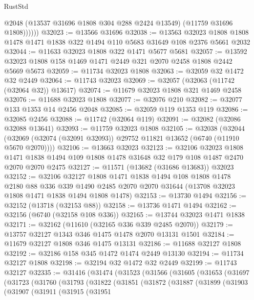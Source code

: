\begin{lexlean}{RustStd}
\begin{coremodule}
              @2048
              (@13537 @31696 @1808 @304 @288 @2424 @13549)
              (@11759 @31696 @1808))))))
@32023 := @13566 @31696
@32038 := @13563
    @32023
    @1808
    @1808
    @1478
    @1471
    @1838
    @322
    @1494
    @110
    @5683
    @31649
    @108
    @2376
    @5661
    @2032
@32044 := @11633 @32023 @1808 @322 @1471 @5677 @5681
@32057 := @13592 @32023 @1808 @158 @1469 @1471 @2449 @321 @2070 @2458 @1808 @2442 @5669 @5673
@32059 := @11734 @32023 @1808
@32063 := @32059 @32 @1472 @32 @2449
@32064 := @11743 @32023
@32069 := @32057 (@32063 (@11742 (@32064 @32)) @13617)
@32074 := @11679 @32023 @1808 @321 @1469 @2458
@32076 := @11688 @32023 @1808
@32077 := @32076 @210
@32082 := @32077 @133 @1353 @14 @2456 @2048
@32085 := @32059 @119 @1353 @119
@32086 := @32085 @2456
@32088 := @11742 (@32064 @119)
@32091 := @32082 (@32086 @32088 @13641)
@32093 := @11759 @32023 @1808
@32105 := @32038
    (@32044 (@32069 (@32074 (@32091 @32093)) @29752 @11821 @13652 (@6740 (@11910 @5670 @2070))))
@32106 := @13663 @32023
@32123 := @32106
    @32023
    @1808
    @1471
    @1838
    @1494
    @109
    @1808
    @1478
    @31648
    @32
    @179
    @108
    @1487
    @2470
    @2070
    @2070
    @2475
@32127 := @11571 (@13682 (@31686 @13683)) @32023
@32152 := @32106
    @32127
    @1808
    @1471
    @1838
    @1494
    @108
    @1808
    @1478
    @2180
    @88
    @336
    @339
    @1490
    @2485
    @2070
    @2070
    @31644
    (@13708 @32023 @1808 @1471 @1838 @1494 @1808 @1478)
@32153 := @13730 @1494
@32156 := @32152 (@13718 (@32153 @88))
@32158 := @13736 @1471 @1494
@32162 := @32156 (@6740 (@32158 @108 @336))
@32165 := @13744 @32023 @1471 @1838
@32171 := @32162 (@11610 (@32165 @336 @339 @2485 @2070))
@32179 := @13757 @32127 @1343 @346 @1475 @1478 @2070 @13131 @1501
@32184 := @11679 @32127 @1808 @346 @1475 @13131
@32186 := @11688 @32127 @1808
@32192 := @32186 @158 @345 @1472 @1474 @2449 @13130
@32194 := @11734 @32127 @1808
@32198 := @32194 @32 @1472 @32 @2449
@32199 := @11743 @32127
@32335 := @31416
    (@31474
      (@31523
        (@31566
          (@31605
            (@31653
              (@31697
                (@31723
                  (@31760
                    (@31793
                      (@31822
                        (@31851
                          (@31872
                            (@31887
                              (@31899
                                (@31903
                                  (@31907
                                    (@31911
                                      (@31915
                                        (@31951

\end{coremodule}
\end{lexlean}
